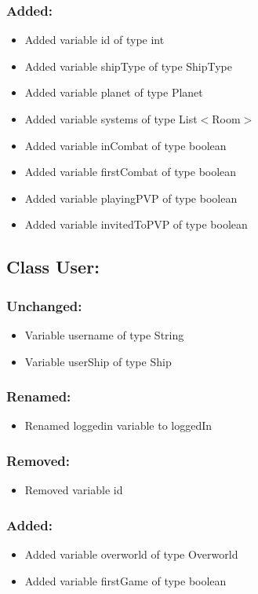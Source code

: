 \documentclass{article}
\begin{document}
\subsubsection{Added:}
\begin{itemize}
\item Added variable id of type int
\item Added variable shipType of type ShipType
\item Added variable planet of type Planet
\item Added variable systems of type List$<$Room$>$
\item Added variable inCombat of type boolean
\item Added variable firstCombat of type boolean
\item Added variable playingPVP of type boolean
\item Added variable invitedToPVP of type boolean
\end{itemize}


\subsection{Class User:}

\subsubsection{Unchanged:}
\begin{itemize}
\item Variable username of type String
\item Variable userShip of type Ship
\end{itemize}

\subsubsection{Renamed:}
\begin{itemize}
\item Renamed loggedin variable to loggedIn
\end{itemize}

\subsubsection{Removed:}
\begin{itemize}
\item Removed variable id
\end{itemize}

\subsubsection{Added:}
\begin{itemize}
\item Added variable overworld of type Overworld
\item Added variable firstGame of type boolean
\end{itemize}
\end{document}
